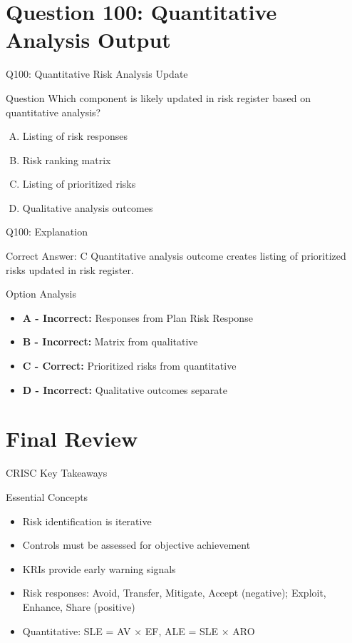 \documentclass{beamer}
\begin{document}
	\section{Question 100: Quantitative Analysis Output}
	
	\begin{frame}{Q100: Quantitative Risk Analysis Update}
		\begin{block}{Question}
			Which component is likely updated in risk register based on quantitative analysis?
		\end{block}
		\begin{enumerate}[(A)]
			\item Listing of risk responses
			\item Risk ranking matrix
			\item Listing of prioritized risks
			\item Qualitative analysis outcomes
		\end{enumerate}
	\end{frame}
	
	\begin{frame}{Q100: Explanation}
		\begin{block}{Correct Answer: C}
			Quantitative analysis outcome creates listing of prioritized risks updated in risk register.
		\end{block}
		\begin{block}{Option Analysis}
			\begin{itemize}
				\item \textbf{A - Incorrect:} Responses from Plan Risk Response
				\item \textbf{B - Incorrect:} Matrix from qualitative
				\item \textbf{C - Correct:} Prioritized risks from quantitative
				\item \textbf{D - Incorrect:} Qualitative outcomes separate
			\end{itemize}
		\end{block}
	\end{frame}
	
	\section{Final Review}
	
	\begin{frame}{CRISC Key Takeaways}
		\begin{block}{Essential Concepts}
			\begin{itemize}
				\item Risk identification is iterative
				\item Controls must be assessed for objective achievement
				\item KRIs provide early warning signals
				\item Risk responses: Avoid, Transfer, Mitigate, Accept (negative); Exploit, Enhance, Share (positive)
				\item Quantitative: SLE = AV × EF, ALE = SLE × ARO
			\end{itemize}
		\end{block}
	\end{frame}
	
\end{document}
